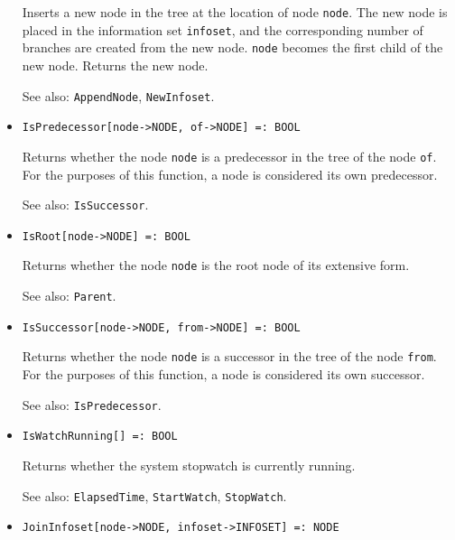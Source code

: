 \begin{itemize}
\bd
Inserts a new node in the tree at the location of
node \verb+node+.  The
new node is placed in the information set \verb+infoset+, and the
corresponding number of branches are created from the new node.  \verb+node+
becomes the first child of the new node.  Returns the new node.
\item
[See also:] {\tt AppendNode}, {\tt NewInfoset}.
\ed

\item
\protect \large \begin{verbatim}
IsPredecessor[node->NODE, of->NODE] =: BOOL
\end{verbatim}\normalsize

\bd
Returns whether the node \verb+node+ is a predecessor
in the tree of the node \verb+of+.  For the purposes of this function,
a node is considered its own predecessor.
\item
[See also:] {\tt IsSuccessor}.
\ed

\item
\protect \large \begin{verbatim}
IsRoot[node->NODE] =: BOOL
\end{verbatim}\normalsize

\bd
Returns whether the node \verb+node+ is the root node of its
extensive form.
\item
[See also:] {\tt Parent}.
\ed

\item
\protect \large \begin{verbatim}
IsSuccessor[node->NODE, from->NODE] =: BOOL
\end{verbatim}\normalsize

\bd
Returns whether the node \verb+node+ is a successor
in the tree of the node \verb+from+.  For the purposes of this function,
a node is considered its own successor.
\item
[See also:] {\tt IsPredecessor}.
\ed

\item
\protect \large \begin{verbatim}
IsWatchRunning[] =: BOOL
\end{verbatim}\normalsize

\bd
Returns whether the system stopwatch is currently running.
\item
[See also:] {\tt ElapsedTime}, {\tt StartWatch}, {\tt StopWatch}.
\ed


\item
\protect \large \begin{verbatim}
JoinInfoset[node->NODE, infoset->INFOSET] =: NODE
\end{verbatim}\normalsize


\end{itemize}
